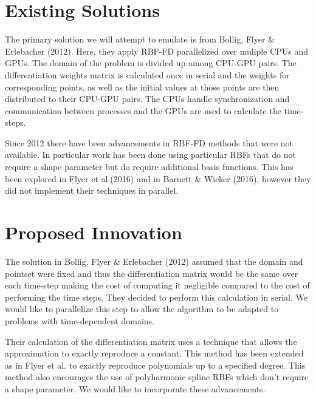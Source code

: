 \documentclass[12pt]{article}
\begin{document}

\section{Existing Solutions}
	The primary solution we will attempt to emulate is from Bollig, Flyer \& Erlebacher (2012)\cite{Bollig2012}. Here, they apply RBF-FD parallelized over muliple CPUs and GPUs. The domain of the problem is divided up among CPU-GPU pairs. The differentiation weights matrix is calculated once in serial and the weights for corresponding points, as well as the initial values at those points are then distributed to their CPU-GPU pairs. The CPUs handle synchronization and communication between processes and the GPUs are used to calculate the time-steps.
	
	Since 2012 there have been advancements in RBF-FD methods that were not available. In particular work has been done using particular RBFs that do not require a shape parameter but do require additional basis functions. This has been explored in 
	Flyer et al.(2016)\cite{Flyer2016-1}\cite{Flyer2017-2} and in Barnett \& Wicker (2016)\cite{FlyerBarnettWicker2016}, however they did not implement their techniques in parallel.
	


\section{Proposed Innovation}
	The solution in Bollig, Flyer \& Erlebacher (2012)\cite{Bollig2012} assumed that the domain and pointset were fixed and thus the differentiation matrix would be the same over each time-step making the cost of computing it negligible compared to the cost of performing the time steps. They decided to perform this calculation in serial. We would like to parallelize this step to allow the algorithm to be adapted to problems with time-dependent domains.
	
	Their calculation of the differentiation matrix uses a technique that allows the approximation to exactly reproduce a constant. This method has been extended as in Flyer et al.\cite{Flyer2016-1}\cite{Flyer2017-2} to exactly reproduce polynomials up to a specified degree. This method also encourages the use of polyharmonic spline RBFs which don't require a shape parameter. We would like to incorporate these advancements.
	
\end{document}
